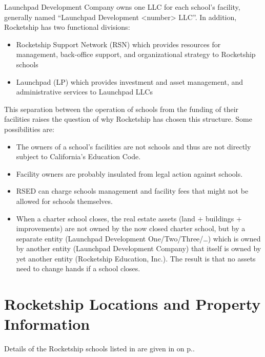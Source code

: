 Launchpad Development Company owns one LLC for each school's facility, generally named ``Launchpad Development <number> LLC''. In addition, Rocketship has two functional divisions:
\begin{itemize}
  \item Rocketship Support Network (RSN) which provides resources for management, back-office support, and organizational strategy to Rocketship schools
  \item Launchpad (LP) which provides investment and asset management, and administrative services to Launchpad LLCs
\end{itemize}

This separation between the operation of schools from the funding of their facilities raises the question of why Rocketship has chosen this structure. Some possibilities are:
\begin{itemize}
  \item The owners of a school's facilities are not schools and thus are not directly subject to California's Education Code.
  \item Facility owners are probably insulated from legal action against schools.
  \item RSED can charge schools management and facility fees that might not be allowed for schools themselves.
  \item When a charter school closes, the real estate assets (land + buildings + improvements) are not owned by the now closed charter school, but by a separate entity (Launchpad Development One/Two/Three/\ldots) which is owned by another entity (Launchpad Development Company) that itself is owned by yet another entity (Rocketship Education, Inc.). The result is that no assets need to change hands if a school closes.
\end{itemize}

\section{Rocketship Locations and Property Information}
\label{sec:location-and-property-info}\indent%

Details of the Rocketship schools listed in  are given in  on p.\pageref{appx:rocketship-property-info}.

